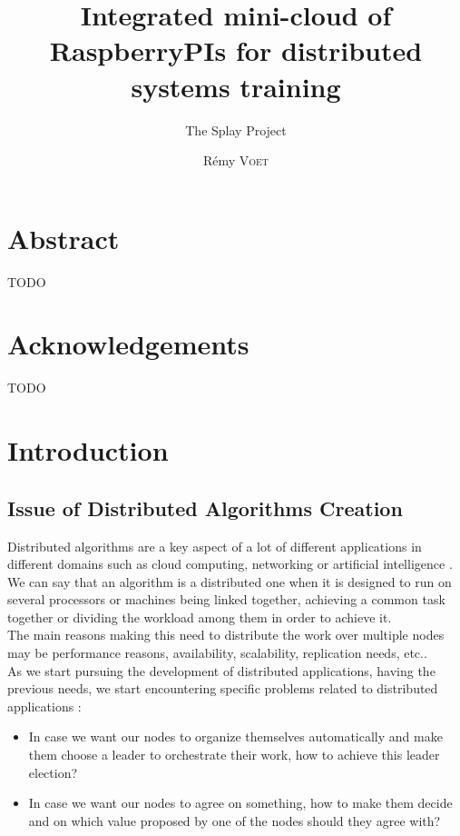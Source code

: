 \documentclass{eplmastersthesis}
\title{Integrated mini-cloud of RaspberryPIs for distributed systems training}
\subtitle{The Splay Project}
\author{Rémy \textsc{Voet}}
\begin{document}
  \maketitle

  \chapter*{Abstract}
  {\color{red} TODO}

  \chapter*{Acknowledgements}
  {\color{red} TODO}

  \tableofcontents

  \chapter{Introduction}

    \section{Issue of Distributed Algorithms Creation}

      Distributed algorithms are a key aspect of a lot of different
      applications in different domains such as cloud computing, networking
      or artificial intelligence \cite{DistributedArtificialIntelligence}.\\
      We can say that an algorithm is a distributed one when it is designed to
      run on several processors or machines being linked together, achieving
      a common task together or dividing the workload among them in order to
      achieve it.\\
      The main reasons making this need to distribute the work over multiple
      nodes may be performance reasons, availability, scalability, replication
      needs, etc..\\
      As we start pursuing the development of distributed applications, having
      the previous needs, we start encountering specific problems related to
      distributed applications :
      \begin{itemize}
        \item In case we want our nodes to organize themselves automatically and
        make them choose a leader to orchestrate their work, how to achieve
        this leader election?
        \item In case we want our nodes to agree on something, how to make
        them decide and on which value proposed by one of the nodes should they
        agree with?
      \end{itemize}
\end{document}
